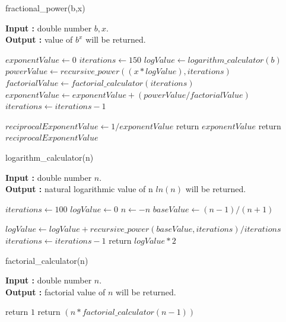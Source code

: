\documentclass[12pt, a4paper]{article}
\begin{document}
\newpage
\begin{algorithm}[hbt!]
\caption{fractional\_power(b,x)}\label{alg:two}

\hspace*{\algorithmicindent} \textbf{Input : }double number $b,x$. \\
\hspace*{\algorithmicindent} \textbf{Output : }value of $b^x$ will be returned.
\begin{algorithmic}[1]
\STATE $exponentValue \gets 0$
\STATE $iterations \gets 150$
\STATE $logValue \gets logarithm\_calculator(b)$
  \STATE $powerValue \gets recursive\_power((x * logValue) , iterations) $
  \STATE $factorialValue \gets factorial\_calculator(iterations)$ 
  \STATE $exponentValue \gets exponentValue + (powerValue / factorialValue)$
  \STATE $iterations \gets iterations - 1$
\ENDWHILE

\STATE $reciprocalExponentValue \gets 1/exponentValue $
  \STATE return $exponentValue$
\ELSE
 \STATE return $reciprocalExponentValue$
\ENDIF

\end{algorithmic}
\end{algorithm}
\vspace*{-.4cm}
\begin{algorithm}[hbt!]
\caption{logarithm\_calculator(n)}\label{alg:two}

\hspace*{\algorithmicindent} \textbf{Input : }double number $n$. \\
\hspace*{\algorithmicindent} \textbf{Output : }natural logarithmic value of n $ln(n)$ will be returned.
\begin{algorithmic}[1]

\STATE $iterations \gets 100$
\STATE $logValue \gets 0 $
  \STATE $n \gets -n$
\ENDIF
\STATE $baseValue \gets (n - 1) / (n + 1) $

  \STATE $logValue \gets logValue + recursive\_power(baseValue , iterations) / iterations $
  \ENDIF
  \STATE $iterations \gets iterations - 1$
\ENDWHILE
\STATE return $logValue * 2$

\end{algorithmic}
\end{algorithm}

\begin{algorithm}[hbt!]
\caption{factorial\_calculator(n)}\label{alg:two}

\hspace*{\algorithmicindent} \textbf{Input : }double number $n$. \\
\hspace*{\algorithmicindent} \textbf{Output : }factorial value of $n$ will be returned.
\begin{algorithmic}[1]

  \STATE return $1$
\ENDIF
\STATE return $ (n * factorial\_calculator(n-1)) $

\end{algorithmic}
\end{algorithm}
\end{document}
